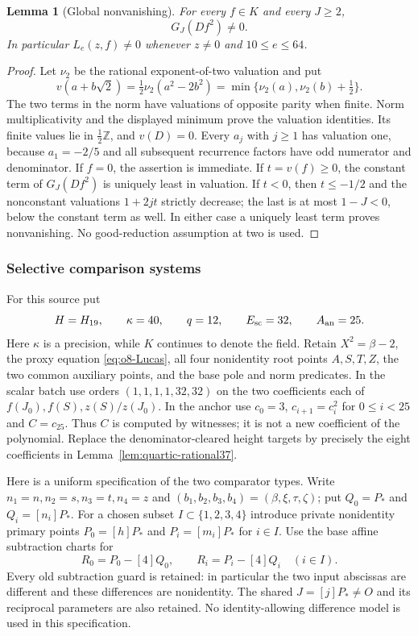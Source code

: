 \documentclass[11pt]{article}
\newtheorem{lemma}[theorem]{Lemma}
\theoremstyle{definition}
\theoremstyle{remark}
\newcommand{\Z}{\mathbb Z}
\begin{document}
\begin{lemma}[Global nonvanishing]
\label{lem:quartic-reciprocal-nonzero}
For every $f\in K$ and every $J\ge2$,
\[
                 G_J(Df^2)\ne0.
\]
In particular $L_e(z,f)\ne0$ whenever $z\ne0$ and $10\le e\le64$.
\end{lemma}
\begin{proof}
Let $\nu_2$ be the rational exponent-of-two valuation and put
\[
 v(a+b\sqrt2)=\tfrac12\nu_2(a^2-2b^2)
             =\min\{\nu_2(a),\nu_2(b)+\tfrac12\}.
\]
The two terms in the norm have valuations of opposite parity when finite.
Norm multiplicativity and the displayed minimum prove the valuation
identities. Its finite values lie in $\tfrac12\Z$, and $v(D)=0$.
Every $a_j$ with $j\ge1$ has valuation one, because $a_1=-2/5$ and
all subsequent recurrence factors have odd numerator and denominator.
If $f=0$, the assertion is immediate. If $t=v(f)\ge0$, the constant
term of $G_J(Df^2)$ is uniquely least in valuation. If $t<0$, then
$t\le-1/2$ and the nonconstant valuations $1+2jt$ strictly decrease;
the last is at most $1-J<0$, below the constant term as well. In either
case a uniquely least term proves nonvanishing. No good-reduction
assumption at two is used.
\end{proof}

\subsubsection{Selective comparison systems}
For this source put
\begin{equation}\label{eq:quartic-selected-parameters}
 H=H_{19},\qquad \kappa=40,\qquad q=12,
 \qquad E_{\rm sc}=32,\qquad A_{\rm an}=25.
\end{equation}
Here $\kappa$ is a precision, while $K$ continues to denote the field.
Retain $X^2=\beta-2$, the proxy equation \eqref{eq:o8-Lucas}, all four
nonidentity root points $A,S,T,Z$, the two common auxiliary points,
and the base pole and norm predicates. In the scalar batch use orders
$(1,1,1,1,32,32)$ on the two coefficients each of
$f(J_0),f(S),z(S)/z(J_0)$. In the anchor use
$c_0=3$, $c_{i+1}=c_i^2$ for $0\le i<25$ and $C=c_{25}$.
Thus $C$ is computed by witnesses; it is not a new coefficient of the
polynomial. Replace the denominator-cleared height targets by precisely
the eight coefficients in Lemma~\ref{lem:quartic-rational37}.

Here is a uniform specification of the two comparator types. Write
$n_1=n,n_2=s,n_3=t,n_4=z$ and
$(b_1,b_2,b_3,b_4)=(\beta,\xi,\tau,\zeta)$; put
$Q_0=P_*$ and $Q_i=[n_i]P_*$. For a chosen subset
$I\subset\{1,2,3,4\}$ introduce private nonidentity primary points
$P_0=[h]P_*$ and $P_i=[m_i]P_*$ for $i\in I$. Use the base affine
subtraction charts for
\[
 R_0=P_0-[4]Q_0,\qquad R_i=P_i-[4]Q_i\quad(i\in I).
\]
Every old subtraction guard is retained: in particular the two input
abscissas are different and these differences are nonidentity. The
shared $J=[j]P_*\ne O$ and its reciprocal parameters are also retained.
No identity-allowing difference model is used in this specification.
\end{document}
